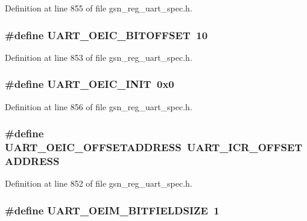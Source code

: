 Definition at line 855 of file gsn\_\-reg\_\-uart\_\-spec.h.

\hypertarget{a00575_a169410e625dfab23c4e3f03e8f742438}{
\subsubsection[{UART\_\-OEIC\_\-BITOFFSET}]{\setlength{\rightskip}{0pt plus 5cm}\#define UART\_\-OEIC\_\-BITOFFSET~10}}
\label{a00575_a169410e625dfab23c4e3f03e8f742438}


Definition at line 853 of file gsn\_\-reg\_\-uart\_\-spec.h.

\hypertarget{a00575_abe77cd89dab6a6c599d7ff62ad857297}{
\subsubsection[{UART\_\-OEIC\_\-INIT}]{\setlength{\rightskip}{0pt plus 5cm}\#define UART\_\-OEIC\_\-INIT~0x0}}
\label{a00575_abe77cd89dab6a6c599d7ff62ad857297}


Definition at line 856 of file gsn\_\-reg\_\-uart\_\-spec.h.

\hypertarget{a00575_ac9d223ca35aeaaf8db776904c5d88b13}{
\subsubsection[{UART\_\-OEIC\_\-OFFSETADDRESS}]{\setlength{\rightskip}{0pt plus 5cm}\#define UART\_\-OEIC\_\-OFFSETADDRESS~UART\_\-ICR\_\-OFFSETADDRESS}}
\label{a00575_ac9d223ca35aeaaf8db776904c5d88b13}


Definition at line 852 of file gsn\_\-reg\_\-uart\_\-spec.h.

\hypertarget{a00575_a08e4f18d9d88beb76052ef296bedb377}{
\subsubsection[{UART\_\-OEIM\_\-BITFIELDSIZE}]{\setlength{\rightskip}{0pt plus 5cm}\#define UART\_\-OEIM\_\-BITFIELDSIZE~1}}
\label{a00575_a08e4f18d9d88beb76052ef296bedb377}


